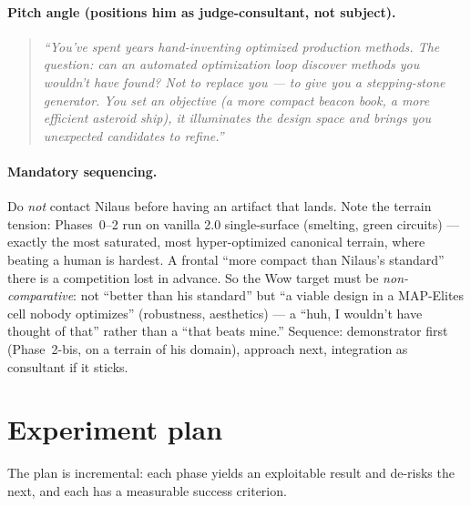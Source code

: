 \documentclass[11pt,a4paper]{article}
\begin{document}
\paragraph{Pitch angle (positions him as judge-consultant, not subject).}
\begin{quote}\itshape
``You've spent years hand-inventing optimized production methods. The question:
can an automated optimization loop discover methods you wouldn't have found? Not
to replace you --- to give you a \emph{stepping-stone generator}. You set an
objective (a more compact beacon book, a more efficient asteroid ship), it
illuminates the design space and brings you unexpected candidates to refine.''
\end{quote}

\paragraph{Mandatory sequencing.}
Do \emph{not} contact Nilaus before having an artifact that lands. Note the
terrain tension: Phases~0--2 run on vanilla 2.0 single-surface (smelting, green
circuits) --- exactly the most saturated, most hyper-optimized canonical terrain,
where beating a human is hardest. A frontal ``more compact than Nilaus's
standard'' there is a competition lost in advance. So the Wow target must be
\emph{non-comparative}: not ``better than his standard'' but ``a viable design in
a MAP-Elites cell nobody optimizes'' (robustness, aesthetics) --- a ``huh, I
wouldn't have thought of that'' rather than a ``that beats mine.'' Sequence:
demonstrator first (Phase~2-bis, on a terrain of his domain), approach next,
integration as consultant if it sticks.

\section{Experiment plan}
\label{sec:plan}

The plan is incremental: each phase yields an exploitable result and de-risks the
next, and each has a measurable success criterion.
\end{document}

